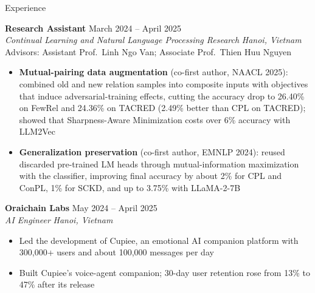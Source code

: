 \documentclass{resume} %
\begin{document}
\begin{rSection}{Experience}
\vspace{0.25em}

\textbf{Research Assistant} \hfill March 2024 -- April 2025\\
\textit{Continual Learning and Natural Language Processing Research}
\hfill \textit{Hanoi, Vietnam}\\
Advisors: Assistant Prof.\ Linh Ngo Van; Associate Prof.\ Thien Huu Nguyen

\begin{itemize}[leftmargin=1.5em,itemsep=0em,topsep=0.1em]
    \item \textbf{Mutual-pairing data augmentation} (co-first author, NAACL 2025):
    combined old and new relation samples into composite inputs with objectives
    that induce adversarial-training effects, cutting the accuracy drop to 26.40\%
    on FewRel and 24.36\% on TACRED (2.49\% better than CPL on TACRED); showed
    that Sharpness-Aware Minimization costs over 6\% accuracy with LLM2Vec
    \item \textbf{Generalization preservation} (co-first author, EMNLP 2024):
    reused discarded pre-trained LM heads through mutual-information
    maximization with the classifier, improving final accuracy by about 2\% for
    CPL and ConPL, 1\% for SCKD, and up to 3.75\% with LLaMA-2-7B
\end{itemize}

\vspace{0.25em}

\textbf{Oraichain Labs} \hfill May 2024 -- April 2025\\
\textit{AI Engineer} \hfill \textit{Hanoi, Vietnam}

\begin{itemize}[leftmargin=1.5em,itemsep=0em,topsep=0.1em]
    \item Led the development of Cupiee, an emotional AI companion platform
    with 300,000+ users and about 100,000 messages per day
    \item Built Cupiee's voice-agent companion; 30-day user retention rose from
    13\% to 47\% after its release
\end{itemize}

\end{rSection}

\end{document}
